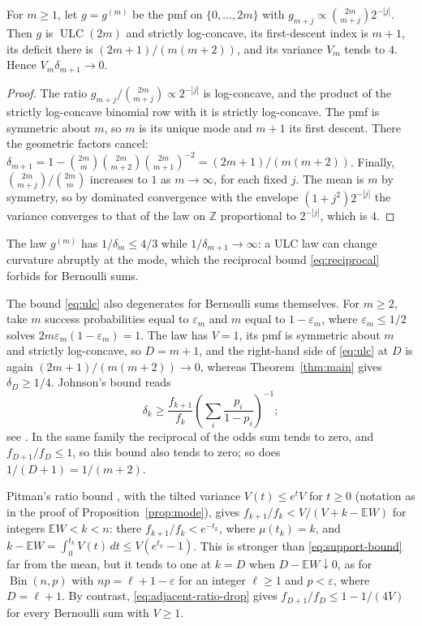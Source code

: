 \documentclass[ECP,preprint]{ejpecp}
\begin{document}
\begin{proposition}\label{prop:ulc}
  For $m\geq1$, let $g=g^{(m)}$ be the pmf on $\{0,\ldots,2m\}$ with
  $g_{m+j}\propto\binom{2m}{m+j}2^{-|j|}$. Then $g$ is
  $\operatorname{ULC}(2m)$ and strictly log-concave, its first-descent index
  is $m+1$, its deficit there is $(2m+1)/(m(m+2))$, and its variance $V_m$
  tends to $4$. Hence $V_m\delta_{m+1}\to0$.
\end{proposition}

\begin{proof}
  The ratio $g_{m+j}/\binom{2m}{m+j}\propto2^{-|j|}$ is log-concave, and the
  product of the strictly log-concave binomial row with it is strictly
  log-concave. The pmf is symmetric about $m$, so $m$ is its unique mode and
  $m+1$ its first descent. There the geometric factors cancel:
  $\delta_{m+1}=1-\binom{2m}{m}\binom{2m}{m+2}\binom{2m}{m+1}^{-2}
  =(2m+1)/(m(m+2))$. Finally, $\binom{2m}{m+j}/\binom{2m}{m}$ increases to
  $1$ as $m\to\infty$, for each fixed $j$. The mean is $m$ by symmetry, so by dominated
  convergence with the envelope $(1+j^2)2^{-|j|}$ the variance converges to
  that of the law on $\mathbb Z$ proportional to $2^{-|j|}$, which is $4$.
\end{proof}

The law $g^{(m)}$ has $1/\delta_m\leq4/3$ while $1/\delta_{m+1}\to\infty$: a
ULC law can change curvature abruptly at the mode, which the reciprocal bound
\eqref{eq:reciprocal} forbids for Bernoulli sums.

The bound \eqref{eq:ulc} also degenerates for Bernoulli sums themselves. For
$m\geq2$, take
$m$ success probabilities equal to $\varepsilon_m$ and $m$ equal to
$1-\varepsilon_m$, where $\varepsilon_m\leq1/2$ solves
$2m\varepsilon_m(1-\varepsilon_m)=1$. The law has
$V=1$, its pmf is symmetric about $m$ and strictly log-concave, so $D=m+1$,
and the right-hand side of \eqref{eq:ulc} at $D$ is again
$(2m+1)/(m(m+2))\to0$, whereas Theorem~\ref{thm:main} gives
$\delta_D\geq1/4$. Johnson's bound reads
\[
  \delta_k\geq \frac{f_{k+1}}{f_k}
  \left(\sum_i\frac{p_i}{1-p_i}\right)^{-1};
\]
see \cite[Definition~1.2, Lemma~5.1, and
Example~5.2(2)]{johnson2017discrete}. In the same family the reciprocal of
the odds sum tends to zero, and $f_{D+1}/f_D\leq1$, so this bound also tends
to zero; so does $1/(D+1)=1/(m+2)$.

Pitman's ratio bound \cite[equation~(21)]{pitman1997}, with the tilted
variance $V(t)\leq e^tV$ for $t\geq0$ (notation as in the proof of
Proposition~\ref{prop:mode}), gives $f_{k+1}/f_k<V/(V+k-\mathbb EW)$ for
integers $\mathbb EW<k<n$: there $f_{k+1}/f_k<e^{-t_k}$, where $\mu(t_k)=k$,
and $k-\mathbb EW=\int_0^{t_k}V(t)\,dt\leq V(e^{t_k}-1)$. This is stronger than
\eqref{eq:support-bound} far from the mean, but it tends to one at $k=D$ when
$D-\mathbb EW\downarrow0$, as for $\operatorname{Bin}(n,p)$ with
$np=\ell+1-\varepsilon$ for an integer $\ell\geq1$ and $p<\varepsilon$, where
$D=\ell+1$. By contrast, \eqref{eq:adjacent-ratio-drop} gives
$f_{D+1}/f_D\leq1-1/(4V)$ for every Bernoulli sum with $V\geq1$.
\end{document}
